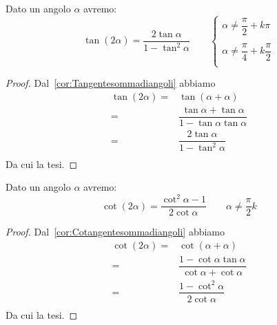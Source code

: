 \begin{thm}\label{thm:Formulediduplicazionetangente}
	Dato un angolo $\alpha$ avremo:
	\[\tan\left(2\alpha\right)=\dfrac{2\tan\alpha}{1-\tan^2\alpha}\qquad\begin{cases}
	\alpha\neq\dfrac{\pi}{2}+k\pi\\
	\\
	\alpha\neq\dfrac{\pi}{4}+k\dfrac{\pi}{2}\\
	\end{cases}\]
\end{thm}
\begin{proof}
Dal~\vref{cor:Tangentesommadiangoli} abbiamo
\begin{align*}
\tan\left(2\alpha\right)=&\tan\left(\alpha+\alpha\right)\\
=&\dfrac{\tan\alpha+\tan\alpha}{1-\tan\alpha\tan\alpha}\\
=&\dfrac{2\tan\alpha}{1-\tan^2\alpha}\\
\end{align*}
Da cui la tesi.
\end{proof}
\begin{thm}\label{thm:Formulediduplicazionecotangente}
	Dato un angolo $\alpha$ avremo:
	\[\cot\left(2\alpha\right)=\dfrac{\cot^2\alpha-1}{2\cot\alpha}\qquad\alpha\neq\dfrac{\pi}{2}k\]
\end{thm}
\begin{proof}
	Dal~\vref{cor:Cotangentesommadiangoli} abbiamo
	\begin{align*}
	\cot\left(2\alpha\right)=&\cot\left(\alpha+\alpha\right)\\
	=&\dfrac{1-\cot\alpha\tan\alpha}{\cot\alpha+\cot\alpha}\\
	=&\dfrac{1-\cot^2\alpha}{2\cot\alpha}\\
	\end{align*}
	Da cui la tesi.
\end{proof}
